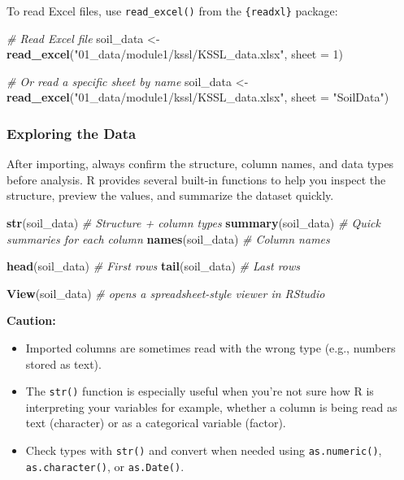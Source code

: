\documentclass[
  10pt,
  b5paper,
  oneside]{book}
\newenvironment{Shaded}{\begin{snugshade}}{\end{snugshade}}
\newcommand{\AttributeTok}[1]{\textcolor[rgb]{0.13,0.29,0.53}{#1}}
\newcommand{\CommentTok}[1]{\textcolor[rgb]{0.56,0.35,0.01}{\textit{#1}}}
\newcommand{\DecValTok}[1]{\textcolor[rgb]{0.00,0.00,0.81}{#1}}
\newcommand{\FunctionTok}[1]{\textcolor[rgb]{0.13,0.29,0.53}{\textbf{#1}}}
\newcommand{\NormalTok}[1]{#1}
\newcommand{\OtherTok}[1]{\textcolor[rgb]{0.56,0.35,0.01}{#1}}
\newcommand{\StringTok}[1]{\textcolor[rgb]{0.31,0.60,0.02}{#1}}
\begin{document}
To read Excel files, use \texttt{read\_excel()} from the \texttt{\{readxl\}} package:

\begin{Shaded}
\begin{Highlighting}[]
\CommentTok{\# Read Excel file}
\NormalTok{soil\_data }\OtherTok{\textless{}{-}} \FunctionTok{read\_excel}\NormalTok{(}\StringTok{"01\_data/module1/kssl/KSSL\_data.xlsx"}\NormalTok{, }\AttributeTok{sheet =} \DecValTok{1}\NormalTok{) }

\CommentTok{\# Or read a specific sheet by name}
\NormalTok{soil\_data }\OtherTok{\textless{}{-}} \FunctionTok{read\_excel}\NormalTok{(}\StringTok{"01\_data/module1/kssl/KSSL\_data.xlsx"}\NormalTok{, }\AttributeTok{sheet =} \StringTok{"SoilData"}\NormalTok{)}
\end{Highlighting}
\end{Shaded}

\subsubsection{Exploring the Data}\label{data-exploration}

After importing, always confirm the structure, column names, and data types before analysis.
R provides several built-in functions to help you inspect the structure, preview the values, and summarize the dataset quickly.

\begin{Shaded}
\begin{Highlighting}[]
\FunctionTok{str}\NormalTok{(soil\_data)        }\CommentTok{\# Structure + column types}
\FunctionTok{summary}\NormalTok{(soil\_data)    }\CommentTok{\# Quick summaries for each column}
\FunctionTok{names}\NormalTok{(soil\_data)      }\CommentTok{\# Column names}

\FunctionTok{head}\NormalTok{(soil\_data)       }\CommentTok{\# First rows}
\FunctionTok{tail}\NormalTok{(soil\_data)       }\CommentTok{\# Last rows}

\FunctionTok{View}\NormalTok{(soil\_data) }\CommentTok{\# opens a spreadsheet{-}style viewer in RStudio}
\end{Highlighting}
\end{Shaded}

\textbf{Caution:}

\begin{itemize}
\item
  Imported columns are sometimes read with the wrong type (e.g., numbers stored as text).
\item
  The \texttt{str()} function is especially useful when you're not sure how R is interpreting your variables for example, whether a column is being read as text (character) or as a categorical variable (factor).
\item
  Check types with \texttt{str()} and convert when needed using \texttt{as.numeric()}, \texttt{as.character()}, or \texttt{as.Date()}.
\end{itemize}
\end{document}
